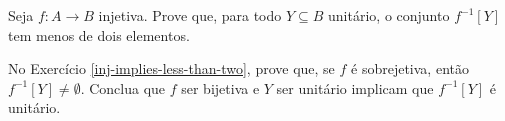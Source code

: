 \begin{exercise}
\label{inj-implies-less-than-two}
Seja $f : A \to B$ injetiva. Prove que, para todo $Y \subseteq B$ unitário, o conjunto $f^{-1}[Y]$ tem menos de dois elementos.
\end{exercise}

\begin{homework}
No Exercício \ref{inj-implies-less-than-two}, prove que, se $f$ é sobrejetiva, então $f^{-1}[Y] \ne \emptyset$. Conclua que $f$ ser bijetiva e $Y$ ser unitário implicam que $f^{-1}[Y]$ é unitário.
\end{homework}
